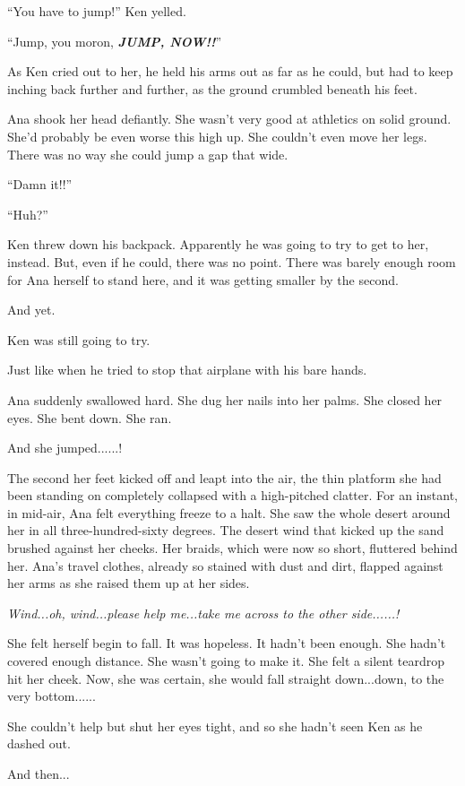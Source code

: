 \documentclass[
]{article}
\begin{document}
``You have to jump!'' Ken yelled.

``Jump, you moron, \emph{\textbf{JUMP, NOW!!}}''

As Ken cried out to her, he held his arms out as far as he could, but
had to keep inching back further and further, as the ground crumbled
beneath his feet.

Ana shook her head defiantly. She wasn't very good at athletics on solid
ground. She'd probably be even worse this high up. She couldn't even
move her legs. There was no way she could jump a gap that wide.

``Damn it!!''

``Huh?''

Ken threw down his backpack. Apparently he was going to try to get to
her, instead. But, even if he could, there was no point. There was
barely enough room for Ana herself to stand here, and it was getting
smaller by the second.

And yet.

Ken was still going to try.

Just like when he tried to stop that airplane with his bare hands.

Ana suddenly swallowed hard. She dug her nails into her palms. She
closed her eyes. She bent down. She ran.

And she jumped......!

The second her feet kicked off and leapt into the air, the thin platform
she had been standing on completely collapsed with a high-pitched
clatter. For an instant, in mid-air, Ana felt everything freeze to a
halt. She saw the whole desert around her in all three-hundred-sixty
degrees. The desert wind that kicked up the sand brushed against her
cheeks. Her braids, which were now so short, fluttered behind her. Ana's
travel clothes, already so stained with dust and dirt, flapped against
her arms as she raised them up at her sides.

\emph{Wind...oh, wind...please help me...take me across to the other
side......!}

She felt herself begin to fall. It was hopeless. It hadn't been enough.
She hadn't covered enough distance. She wasn't going to make it. She
felt a silent teardrop hit her cheek. Now, she was certain, she would
fall straight down...down, to the very bottom......

She couldn't help but shut her eyes tight, and so she hadn't seen Ken as
he dashed out.

And then...
\end{document}
